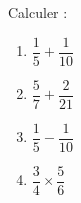 
\begin{exercice}\label{exo2smath-0002}

    Calculer :
    \begin{enumerate}
        \item
            \( \dfrac{ 1 }{ 5 }+\dfrac{ 1 }{ 10 }\)
        \item
            \( \dfrac{ 5 }{ 7 }+\dfrac{ 2 }{ 21 }\)
        \item
            \( \dfrac{ 1 }{ 5 }-\dfrac{ 1 }{ 10 }\)
        \item
            \( \dfrac{ 3 }{ 4 }\times \dfrac{ 5 }{ 6 }\)
    \end{enumerate}


\end{exercice}
